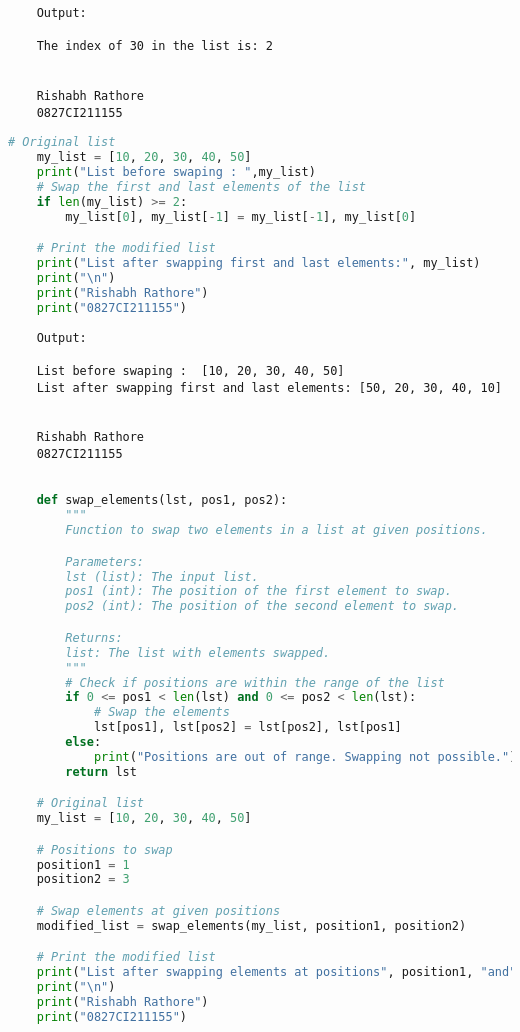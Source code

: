 \documentclass{report}
\begin{document}
\begin{verbatim}

	Output:

	The index of 30 in the list is: 2


	Rishabh Rathore
	0827CI211155
\end{verbatim}
\newpage


\sol{}
\begin{lstlisting}[language=Python]
	# Original list
	my_list = [10, 20, 30, 40, 50]
	print("List before swaping : ",my_list)
	# Swap the first and last elements of the list
	if len(my_list) >= 2:
		my_list[0], my_list[-1] = my_list[-1], my_list[0]

	# Print the modified list
	print("List after swapping first and last elements:", my_list)
	print("\n")
	print("Rishabh Rathore")
	print("0827CI211155")
\end{lstlisting}

\begin{verbatim}
	Output:

	List before swaping :  [10, 20, 30, 40, 50]
	List after swapping first and last elements: [50, 20, 30, 40, 10]
	
	
	Rishabh Rathore
	0827CI211155
\end{verbatim}
\newpage


\sol{}
\begin{lstlisting}[language=Python]

	def swap_elements(lst, pos1, pos2):
		"""
		Function to swap two elements in a list at given positions.

		Parameters:
		lst (list): The input list.
		pos1 (int): The position of the first element to swap.
		pos2 (int): The position of the second element to swap.

		Returns:
		list: The list with elements swapped.
		"""
		# Check if positions are within the range of the list
		if 0 <= pos1 < len(lst) and 0 <= pos2 < len(lst):
			# Swap the elements
			lst[pos1], lst[pos2] = lst[pos2], lst[pos1]
		else:
			print("Positions are out of range. Swapping not possible.")
		return lst

	# Original list
	my_list = [10, 20, 30, 40, 50]

	# Positions to swap
	position1 = 1
	position2 = 3

	# Swap elements at given positions
	modified_list = swap_elements(my_list, position1, position2)

	# Print the modified list
	print("List after swapping elements at positions", position1, "and", position2, ":", modified_list)
	print("\n")
	print("Rishabh Rathore")
	print("0827CI211155")
\end{lstlisting}
\end{document}
